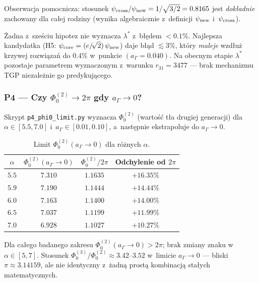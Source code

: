 Obserwacja pomocnicza: stosunek $\psi_{\rm cross}/\psi_{\rm new} = 1/\sqrt{3/2}
= 0.8165$ jest \emph{dokładnie} zachowany dla całej rodziny
(wynika algebraicznie z~definicji $\psi_{\rm new}$ i~$\psi_{\rm cross}$).

\begin{result}%
\label{res:p2}
Żadna z~sześciu hipotez nie wyznacza $\lambda^*$ z~błędem $<0.1\%$.
Najlepsza kandydatka (H5: $\psi_{\rm core} = (e/\!\sqrt{2})\,\psi_{\rm new}$)
daje błąd $\lesssim 3\%$, który \emph{maleje} wzdłuż krzywej rozwiązań
do $0.4\%$ w~punkcie $(a_\Gamma = 0.040)$.
Na obecnym etapie $\lambda^*$ pozostaje parametrem wyznaczonym
z~warunku $r_{31} = 3477$ — brak mechanizmu TGP niezależnie
go predykującego.
\end{result}

\subsubsection*{P4 — Czy $\Phi_0^{(2)} \to 2\pi$ gdy $a_\Gamma \to 0$?}

Skrypt \texttt{p4\_phi0\_limit.py} wyznacza $\Phi_0^{(2)}$ (wartość tła
drugiej generacji) dla $\alpha \in [5.5, 7.0]$ i~$a_\Gamma \in [0.01, 0.10]$,
a~następnie ekstrapoluje do $a_\Gamma \to 0$.

\begin{table}[h]
\centering\small
\caption{Limit $\Phi_0^{(2)}(a_\Gamma \to 0)$ dla różnych $\alpha$.}
\label{tab:p4-phi0}
\begin{tabular}{@{}cccc@{}}
\toprule
$\alpha$ & $\Phi_0^{(2)}(a_\Gamma\to 0)$ & $\Phi_0^{(2)} / 2\pi$ & Odchylenie od $2\pi$ \\
\midrule
$5.5$ & $7.310$ & $1.1635$ & $+16.35\%$ \\
$5.9$ & $7.190$ & $1.1444$ & $+14.44\%$ \\
$6.0$ & $7.163$ & $1.1400$ & $+14.00\%$ \\
$6.5$ & $7.037$ & $1.1199$ & $+11.99\%$ \\
$7.0$ & $6.928$ & $1.1027$ & $+10.27\%$ \\
\bottomrule
\end{tabular}
\end{table}

Dla całego badanego zakresu $\Phi_0^{(2)}(a_\Gamma \to 0) > 2\pi$;
brak zmiany znaku w~$\alpha \in [5, 7]$.
Stosunek $\Phi_0^{(3)}/\Phi_0^{(2)} \approx 3.42\text{--}3.52$
w~limicie $a_\Gamma \to 0$ — bliski $\pi \approx 3.14159$,
ale nie identyczny z~żadną prostą kombinacją stałych matematycznych.

